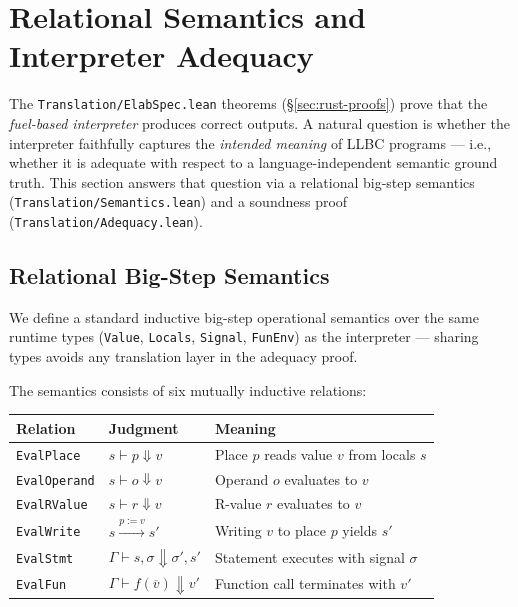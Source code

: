 
\section{Relational Semantics and Interpreter Adequacy}
\label{sec:semantics}

The \texttt{Translation/ElabSpec.lean} theorems (\S\ref{sec:rust-proofs})
prove that the \emph{fuel-based interpreter} produces correct outputs.
A natural question is whether the interpreter faithfully captures the
\emph{intended meaning} of LLBC programs — i.e., whether it is adequate
with respect to a language-independent semantic ground truth.
This section answers that question via a relational big-step semantics
(\texttt{Translation/Semantics.lean}) and a soundness proof
(\texttt{Translation/Adequacy.lean}).

\subsection{Relational Big-Step Semantics}

We define a standard inductive big-step operational semantics over the
same runtime types (\texttt{Value}, \texttt{Locals}, \texttt{Signal},
\texttt{FunEnv}) as the interpreter — sharing types avoids any
translation layer in the adequacy proof.

The semantics consists of six mutually inductive relations:

\begin{center}
\small
\begin{tabular}{@{}lll@{}}
\toprule
\textbf{Relation} & \textbf{Judgment} & \textbf{Meaning} \\
\midrule
\texttt{EvalPlace}   & $s \vdash p \Downarrow v$           & Place $p$ reads value $v$ from locals $s$ \\
\texttt{EvalOperand} & $s \vdash o \Downarrow v$           & Operand $o$ evaluates to $v$ \\
\texttt{EvalRValue}  & $s \vdash r \Downarrow v$           & R-value $r$ evaluates to $v$ \\
\texttt{EvalWrite}   & $s \xrightarrow{p := v} s'$         & Writing $v$ to place $p$ yields $s'$ \\
\texttt{EvalStmt}    & $\Gamma \vdash s, \sigma \Downarrow \sigma', s'$ & Statement executes with signal $\sigma$ \\
\texttt{EvalFun}     & $\Gamma \vdash f(\overline{v}) \Downarrow v'$ & Function call terminates with $v'$ \\
\bottomrule
\end{tabular}
\end{center}

